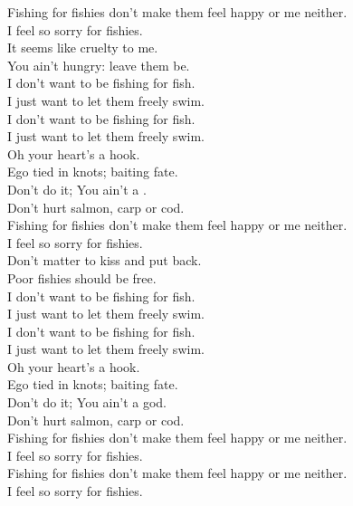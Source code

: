 
\label{album:fishing-for-fishiesp}




Fishing for fishies don't make them feel happy or me neither. \\
I feel so sorry for fishies. \\
It seems like cruelty to me. \\
You ain't hungry: leave them be. \\

I don't want to be fishing for fish. \\
I just want to let them freely swim. \\
I don't want to be fishing for fish. \\
I just want to let them freely swim. \\

Oh your heart's a hook. \\
Ego tied in knots; baiting fate. \\
Don't do it; You ain't a . \\
Don't hurt salmon, carp or cod. \\

Fishing for fishies don't make them feel happy or me neither. \\
I feel so sorry for fishies. \\
Don't matter to kiss and put back. \\
Poor fishies should be free. \\

I don't want to be fishing for fish. \\
I just want to let them freely swim. \\
I don't want to be fishing for fish. \\
I just want to let them freely swim. \\

Oh your heart's a hook. \\
Ego tied in knots; baiting fate. \\
Don't do it; You ain't a god. \\
Don't hurt salmon, carp or cod. \\

Fishing for fishies don't make them feel happy or me neither. \\
I feel so sorry for fishies. \\
Fishing for fishies don't make them feel happy or me neither. \\
I feel so sorry for fishies. \\

